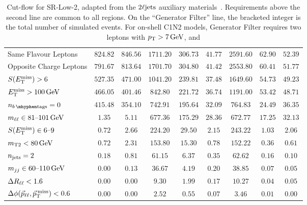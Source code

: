 \begin{sidewaystable}[tp]
{\begin{tabular}{lcccccccc}
Same Flavour Leptons                                       & $824.82$ & $846.56$ & $1711.20$ & $306.73$ & $41.77$ & $2591.60$ & $62.90$ & $52.39$ \\
Opposite Charge Leptons                                   & $791.67$ & $813.64$ & $1701.70$ & $304.80$ & $41.42$ & $2553.80$ & $60.41$ & $51.77$ \\
$\metsig > 6$                                               & $527.35$ & $471.00$ & $1041.20$ & $239.81$ & $37.48$ & $1649.60$ & $54.73$ & $49.23$ \\
$\met > 100\,\eV[G]$                                           & $466.05$ & $401.46$ & $842.80$ & $221.72$ & $36.74$ & $1191.00$ & $53.42$ & $48.71$ \\
\hline
$\nbtag = 0$                                             & $415.48$ & $354.10$ & $742.91$ & $195.64$ & $32.09$ & $764.83$ & $24.49$ & $36.35$ \\
$\mll \in 81\text{--}101\,\eV[G]$                            & $1.35$ & $5.11$ & $677.36$ & $175.29$ & $28.36$ & $672.77$ & $17.25$ & $32.13$ \\
$\metsig \in 6\text{--}9$                                 & $0.72$ & $2.66$ & $224.20$ & $29.50$ & $2.15$ & $243.22$ & $1.03$ & $2.06$ \\
$\mttwo < 80\,\eV[G]$                                        & $0.72$ & $2.31$ & $153.80$ & $15.30$ & $0.78$ & $152.22$ & $0.36$ & $0.61$ \\
$\njet = 2$                                  & $0.18$ & $0.81$ & $61.15$ & $6.37$ & $0.35$ & $62.62$ & $0.16$ & $0.10$ \\
$\mjj \in 60\text{--}110\,\eV[G]$                            & $0.00$ & $0.13$ & $36.67$ & $4.19$ & $0.20$ & $38.85$ & $0.07$ & $0.05$ \\
$\rll < 1.6$                                              & $0.00$ & $0.00$ & $9.30$ & $1.99$ & $0.17$ & $10.27$ & $0.04$ & $0.05$ \\
$\dphillmet < 0.6$                        & $0.00$ & $0.00$ & $2.52$ & $0.55$ & $0.07$ & $3.46$ & $0.01$ & $0.00$ \\
\end{tabular}
}
\caption[
Cut-flow for SR-Low-2
]{%
Cut-flow for SR-Low-2,
adapted from the $\twoljets$ auxiliary materials~\cite{hepdata.116034}.
Requirements above the second line are common to all regions.
On the ``Generator Filter'' line, the bracketed integer is the total number of
simulated events.
For on-shell C1N2 models, Generator Filter requires
two leptons with $\pt > 7\,\eV[G]$, and
}
\end{sidewaystable}
